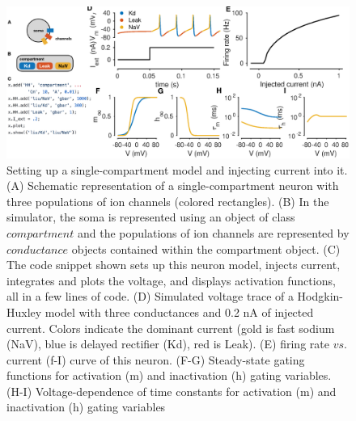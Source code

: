 \documentclass{frontiersSCNS} %
\begin{document}
\begin{figure}
	\centering
	\includegraphics[width=1.0\linewidth]{gfx/figure_HH}
	\caption{Setting up a single-compartment model and injecting current into it. (A) Schematic representation of a single-compartment neuron with three populations of ion channels (colored rectangles). (B) In the simulator, the soma is represented using an object of class $compartment$ and the populations of ion channels are represented by $conductance$ objects contained within the compartment object. (C) The code snippet shown sets up this neuron model, injects current, integrates and plots the voltage, and displays activation functions, all in a few lines of code. (D) Simulated voltage trace of a Hodgkin-Huxley model with three conductances and 0.2 nA of injected current. Colors indicate the dominant current (gold is fast sodium (NaV), blue is delayed rectifier (Kd), red is Leak). (E) firing rate $vs$. current (f-I) curve of this neuron. (F-G) Steady-state gating functions for activation (m) and inactivation (h) gating variables. (H-I) Voltage-dependence of time constants for activation (m) and inactivation (h) gating variables}
	\label{fig:figurehh}
\end{figure}
\end{document}
